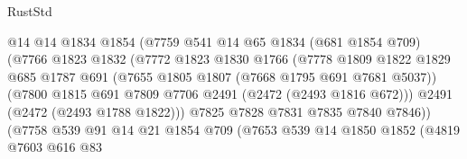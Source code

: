 \begin{lexlean}{RustStd}
\begin{coremodule}
                                  @14
                                  @14
                                  @1834
                                  @1854
                                  (@7759
                                    @541
                                    @14
                                    @65
                                    @1834
                                    (@681 @1854 @709)
                                    (@7766
                                      @1823
                                      @1832
                                      (@7772
                                        @1823
                                        @1830
                                        @1766
                                        (@7778
                                          @1809
                                          @1822
                                          @1829
                                          @685
                                          @1787
                                          @691
                                          (@7655 @1805 @1807 (@7668 @1795 @691 @7681 @5037))
                                          (@7800
                                            @1815
                                            @691
                                            @7809
                                            @7706
                                            @2491
                                            (@2472 (@2493 @1816 @672)))
                                          @2491
                                          (@2472 (@2493 @1788 @1822)))
                                        @7825
                                        @7828
                                        @7831
                                        @7835
                                        @7840
                                        @7846))
                                    (@7758
                                      @539
                                      @91
                                      @14
                                      @21
                                      @1854
                                      @709
                                      (@7653
                                        @539
                                        @14
                                        @1850
                                        @1852
                                        (@4819
                                          @7603
                                          @616
                                          @83

\end{coremodule}
\end{lexlean}
